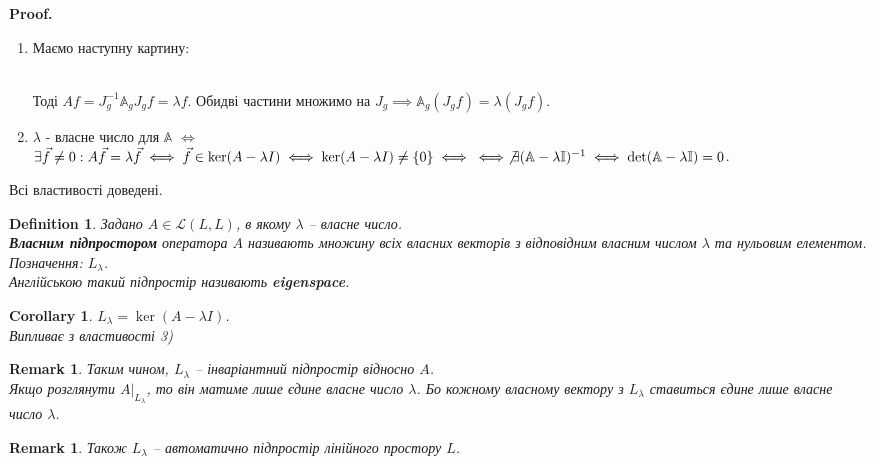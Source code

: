 \documentclass[a4paper, 10pt]{article}
\makeatletter
\theoremstyle{theoremdd}
\newtheorem{definition}[theorem]{Definition}
\newtheorem{remark}[theorem]{Remark}
\newtheorem{corollary}[theorem]{Corollary}
\renewenvironment{proof}[1][Proof.\\]{\par
\pushQED{\hfill \qed}%
\normalfont \topsep6\p@\@plus6\p@\relax
\trivlist
\item\relax
{\bfseries
#1\@addpunct{.}}\hspace\labelsep\ignorespaces
}{%
\popQED\endtrivlist\@endpefalse
}
\makeatother
\begin{document}
\begin{proof}
\begin{enumerate}[wide=0pt, label={\arabic*)},topsep=-\parskip]
\item Маємо наступну картину:\\
\\
Тоді $Af = J_g^{-1} \mathbb{A}_g J_g f = \lambda f$. Обидві частини множимо на $J_g \implies \mathbb{A}_g (J_g f) = \lambda (J_g f)$.

\item $\lambda$ - власне число для $\mathbb{A}$ $\iff$ $\exists \vec{f} \neq 0: A \vec{f} = \lambda \vec{f} \iff \vec{f} \in \ker (A-\lambda I) \iff \ker (A-\lambda I) \neq \{0\} \iff \\ \iff \not\exists (\mathbb{A} - \lambda \mathbb{I})^{-1} \iff \det (\mathbb{A} - \lambda \mathbb{I}) = 0$.
\end{enumerate}
Всі властивості доведені.
\end{proof}

\begin{definition}
Задано $A \in \mathcal{L}(L,L)$, в якому $\lambda$ -- власне число.\\
\textbf{Власним підпростором} оператора $A$ називають множину всіх власних векторів з відповідним власним числом $\lambda$ та нульовим елементом.\\
Позначення: $L_{\lambda}$. \\
Англійською такий підпростір називають \textbf{eigenspace}.
\end{definition}

\begin{corollary}
$L_\lambda = \ker(A-\lambda I)$.\\
\textit{Випливає з властивості 3)}
\end{corollary}

\begin{remark}
Таким чином, $L_{\lambda}$ -- інваріантний підпростір відносно $A$. \\
Якщо розглянути $A|_{L_{\lambda}}$, то він матиме лише єдине власне число $\lambda$. Бо кожному власному вектору з $L_{\lambda}$ ставиться єдине лише власне число $\lambda$.
\end{remark}

\begin{remark}
\label{eigenspace_is_subspace}
Також $L_\lambda$ -- автоматично підпростір лінійного простору $L$.
\end{remark}
\end{document}
